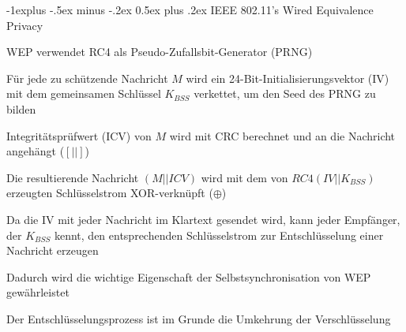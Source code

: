 \documentclass[a4paper]{article}
\makeatletter
\renewcommand{\subsection}{\@startsection{subsection}{2}{0mm}%
 {-1explus -.5ex minus -.2ex}%
 {0.5ex plus .2ex}%
 {\normalfont\normalsize\bfseries}}
\makeatother
\begin{document}
\begin{multicols}{3}
      \subsection{IEEE 802.11's Wired Equivalence Privacy}
      \begin{itemize*}
            \item WEP verwendet RC4 als Pseudo-Zufallsbit-Generator (PRNG)
            \begin{itemize*}
                  \item Für jede zu schützende Nachricht $M$ wird ein 24-Bit-Initialisierungsvektor (IV) mit dem gemeinsamen Schlüssel $K_{BSS}$ verkettet, um den Seed des PRNG zu bilden
                  \item Integritätsprüfwert (ICV) von $M$ wird mit CRC berechnet und an die Nachricht angehängt ($[||]$)
                  \item Die resultierende Nachricht $(M || ICV)$ wird mit dem von $RC4(IV || K_{BSS})$ erzeugten Schlüsselstrom XOR-verknüpft ($\oplus$)
            \end{itemize*}
            \item Da die IV mit jeder Nachricht im Klartext gesendet wird, kann jeder Empfänger, der $K_{BSS}$ kennt, den entsprechenden Schlüsselstrom zur Entschlüsselung einer Nachricht erzeugen
            \item Dadurch wird die wichtige Eigenschaft der Selbstsynchronisation von WEP gewährleistet
            \item Der Entschlüsselungsprozess ist im Grunde die Umkehrung der Verschlüsselung
      \end{itemize*}


\end{multicols}
\end{document}

